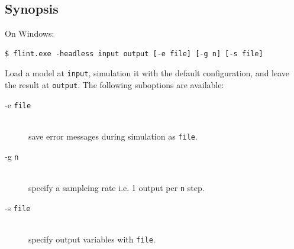 \documentclass[a4paper,10pt]{report}
\begin{document}
\subsection{Synopsis}
On Windows:
\begin{verbatim}
$ flint.exe -headless input output [-e file] [-g n] [-s file]
\end{verbatim}
Load a model at {\tt input}, simulation it with the default configuration,
and leave the result at {\tt output}.
The following suboptions are available:
\begin{description}
\item[-e {\tt file}] \hfill \\
  save error messages during simulation as {\tt file}.
\item[-g {\tt n}] \hfill \\
  specify a sampleing rate i.e. 1 output per {\tt n} step.
\item[-s {\tt file}] \hfill \\
  specify output variables with {\tt file}.
\end{description}
\end{document}
